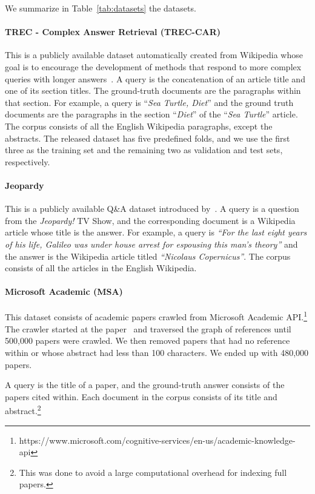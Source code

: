 \documentclass[11pt,letterpaper]{article}
\begin{document}
We summarize in Table~\ref{tab:datasets} the datasets. 

\paragraph{TREC - Complex Answer Retrieval (TREC-CAR)} This is a publicly available dataset automatically created from Wikipedia whose goal is to encourage the development of methods that respond to more complex queries with longer answers~\cite{dietz2017trec}. A query is the concatenation of an article title and one of its section titles. The ground-truth documents are the paragraphs within that section. For example, a query is ``\textit{Sea Turtle, Diet}'' and the ground truth documents are the paragraphs in the section ``\textit{Diet}'' of the ``\textit{Sea Turtle}'' article. The corpus consists of all the English Wikipedia paragraphs, except the abstracts. The released dataset has five predefined folds, and we use the first three as the training set and the remaining two as validation and test sets, respectively.

\paragraph{Jeopardy} This is a publicly available Q\&A dataset introduced by~\citet{nogueira2016end}. A query is a question from the \textit{Jeopardy!} TV Show, and the corresponding document is a Wikipedia article whose title is the answer. For example, a query is \textit{``For the last eight years of his life, Galileo was under house arrest for espousing this man’s theory''} and the answer is the Wikipedia article titled \textit{``Nicolaus Copernicus''}.
The corpus consists of all the articles in the English Wikipedia.

\paragraph{Microsoft Academic (MSA)} This dataset consists of academic papers crawled from Microsoft Academic API.\footnote{https://www.microsoft.com/cognitive-services/en-us/academic-knowledge-api} The crawler started at the paper~\citep{silver2016mastering} and traversed the graph of references until 500,000 papers were crawled. We then removed papers that had no reference within or whose abstract had less than 100 characters. We ended up with 480,000 papers.

A query is the title of a paper, and the ground-truth answer consists of the papers cited within. Each document in the corpus consists of its title and abstract.\footnote{This was done to avoid a large computational overhead for indexing full papers.}
\end{document}
